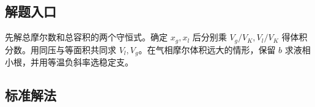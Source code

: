 \documentclass[UTF8,fontset=fandol,a4paper,11pt]{ctexart}
\begin{document}

\subsection*{解题入口}

先解总摩尔数和总容积的两个守恒式。确定 $x_g,x_l$ 后分别乘 $V_g/V_K,V_l/V_K$ 得体积分数。用同压与等面积共同求 $V_l,V_g$。在气相摩尔体积远大的情形，保留 $b$ 求液相小根，并用等温负斜率选稳定支。




\subsection*{标准解法}
\end{document}
